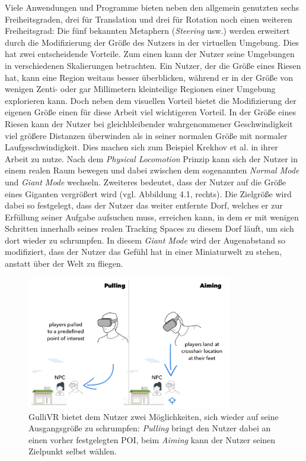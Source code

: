 Viele Anwendungen und Programme bieten neben den allgemein genutzten sechs Freiheitsgraden, drei für Translation und drei für Rotation noch einen weiteren Freiheitsgrad:
Die fünf bekannten Metaphern (\textit{Steering} usw.) werden erweitert durch die Modifizierung der Größe des Nutzers in der virtuellen Umgebung. Dies hat zwei entscheidende Vorteile. Zum einen kann der Nutzer seine Umgebungen in verschiedenen Skalierungen betrachten. Ein Nutzer, der die Größe eines Riesen hat, kann eine Region weitaus besser überblicken, während er in der Größe von wenigen Zenti- oder gar Millimetern kleinteilige Regionen einer Umgebung explorieren kann. Doch neben dem visuellen Vorteil bietet die Modifizierung der eigenen Größe einen für diese Arbeit viel wichtigeren Vorteil. In der Größe eines Riesen kann der Nutzer bei gleichbleibender wahrgenommener Geschwindigkeit viel größere Distanzen überwinden als in seiner normalen Größe mit normaler Laufgeschwindigkeit.
Dies machen sich zum Beispiel Krekhov et al. \cite{Krekhov2018GulliVR} in ihrer Arbeit zu nutze. Nach dem \textit{Physical Locomotion} Prinzip kann sich der Nutzer in einem realen Raum bewegen und dabei zwischen dem sogenannten \textit{Normal Mode} und \textit{Giant Mode} wechseln. Zweiteres bedeutet, dass der Nutzer auf die Größe eines \glqq Giganten\grqq{} vergrößert wird (vgl. Abbildung 4.1, rechts). Die Zielgröße wird dabei so festgelegt, dass der Nutzer das weiter entfernte Dorf, welches er zur Erfüllung seiner Aufgabe aufsuchen muss, erreichen kann, in dem er mit wenigen Schritten innerhalb seines realen Tracking Spaces zu diesem Dorf läuft, um sich dort wieder zu schrumpfen. In diesem \textit{Giant Mode} wird der Augenabstand so modifiziert, dass der Nutzer das Gefühl hat in einer Miniaturwelt zu stehen, anstatt über der Welt zu fliegen. 

\begin{figure}[h]
  \centering
  \includegraphics[width=0.8\textwidth]{images/pulling_aiming.png}
  \caption{GulliVR bietet dem Nutzer zwei Möglichkeiten, sich wieder auf seine Ausgangsgröße zu schrumpfen: \textit{Pulling} bringt den Nutzer dabei an einen vorher festgelegten POI, beim \textit{Aiming} kann der Nutzer seinen Zielpunkt selbst wählen. \cite{Krekhov2018GulliVR}}
  \label{fig:todo}
\end{figure}

